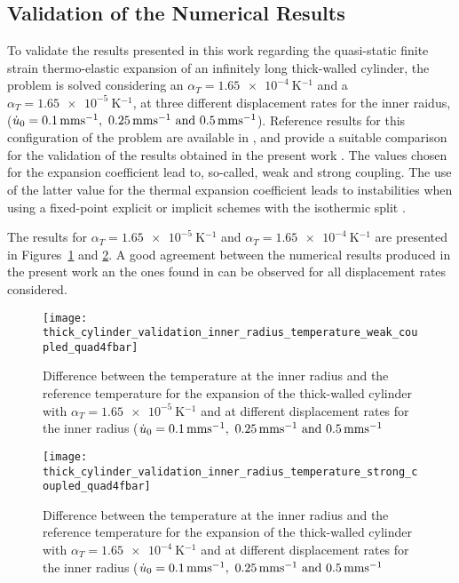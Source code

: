 \subsection{Validation of the Numerical Results}

To validate the results presented in this work regarding the quasi-static finite strain thermo-elastic expansion of an infinitely long thick-walled cylinder,
the problem is solved considering an \(\alpha_T = \SI{1.65e-4}{\kelvin^{-1}}\) and a \(\alpha_T = \SI{1.65e-5}{\kelvin^{-1}}\), at three different displacement rates for the inner raidus, (\(\dot u_0 = \SIlist{0.1; 0.25; 0.5}{\milli\meter\second^{-1}}\)).
Reference results for this configuration of the problem are available in \cite{ibrahimbegovic_thermodynamics_2009}, and provide a suitable comparison for the validation of the results obtained in the present work .
The values chosen for the expansion coefficient lead to, so-called, weak and strong coupling.
The use of the latter value for the thermal expansion coefficient leads to instabilities when using a fixed-point explicit or implicit schemes with the isothermic split \citep{ibrahimbegovic_thermodynamics_2009, erbts_accelerated_2012}.

The results for \(\alpha_T = \SI{1.65e-5}{\kelvin^{-1}}\) and \(\alpha_T =\SI{1.65e-4}{\kelvin^{-1}}\) are presented in Figures~\ref{fig:thick_cylinder_validation_inner_radius_temperature_weak_coupled_quad4fbar} and \ref{fig:thick_cylinder_validation_inner_radius_temperature_strong_coupled_quad4fbar}.
A good agreement between the numerical results produced in the present work an the ones found in \cite{ibrahimbegovic_thermodynamics_2009} can be observed for all displacement rates considered.

\begin{figure}
  \texttt{[image: thick\_cylinder\_validation\_inner\_radius\_temperature\_weak\_coupled\_quad4fbar]}
  \caption{Difference between the temperature at the inner radius and the reference temperature for the expansion of the thick-walled cylinder with \(\alpha_T=\SI{1.65e-5}{\kelvin^{-1}}\) and at different displacement rates for the inner radius (\(\dot u_0 = \SIlist{0.1; 0.25; 0.5}{\milli\meter\second^{-1}}\)}
\label{fig:thick_cylinder_validation_inner_radius_temperature_weak_coupled_quad4fbar}

\end{figure}
\begin{figure}
  \texttt{[image: thick\_cylinder\_validation\_inner\_radius\_temperature\_strong\_coupled\_quad4fbar]}
  \caption{Difference between the temperature at the inner radius and the reference temperature for the expansion of the thick-walled cylinder with \(\alpha_T=\SI{1.65e-4}{\kelvin^{-1}}\) and at different displacement rates for the inner radius (\(\dot u_0 = \SIlist{0.1; 0.25; 0.5}{\milli\meter\second^{-1}}\)}
\label{fig:thick_cylinder_validation_inner_radius_temperature_strong_coupled_quad4fbar}
\end{figure}

